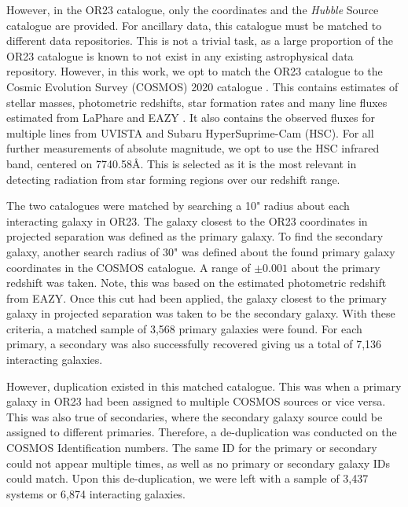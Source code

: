 \documentclass[fleqn,usenatbib]{mnras}
\begin{document}
However, in the OR23 catalogue, only the coordinates and the \textit{Hubble} Source catalogue are provided. For ancillary data, this catalogue must be matched to different data repositories. This is not a trivial task, as a large proportion of the OR23 catalogue is known to not exist in any existing astrophysical data repository. However, in this work, we opt to match the OR23 catalogue to the Cosmic Evolution Survey (COSMOS) 2020 catalogue \citep{2022ApJS..258...11W}. This contains estimates of stellar masses, photometric redshifts, star formation rates and many line fluxes estimated from LaPhare \citep{LaPhare paper} and EAZY \citep{EAZY paper}. It also contains the observed fluxes for multiple lines from UVISTA and Subaru HyperSuprime-Cam (HSC). For all further measurements of absolute magnitude, we opt to use the HSC infrared band, centered on 7740.58\AA. This is selected as it is the most relevant in detecting radiation from star forming regions over our redshift range.

The two catalogues were matched by searching a 10" radius about each interacting galaxy in OR23. The galaxy closest to the OR23 coordinates in projected separation was defined as the primary galaxy. To find the secondary galaxy, another search radius of 30" was defined about the found primary galaxy coordinates in the COSMOS catalogue. A range of $\pm0.001$ about the primary redshift was taken. Note, this was based on the estimated photometric redshift from EAZY. Once this cut had been applied, the galaxy closest to the primary galaxy in projected separation was taken to be the secondary galaxy. With these criteria, a matched sample of 3,568 primary galaxies were found. For each primary, a secondary was also successfully recovered giving us a total of 7,136 interacting galaxies.

However, duplication existed in this matched catalogue. This was when a primary galaxy in OR23 had been assigned to multiple COSMOS sources or vice versa. This was also true of secondaries, where the secondary galaxy source could be assigned to different primaries. Therefore, a de-duplication was conducted on the COSMOS Identification numbers. The same ID for the primary or secondary could not appear multiple times, as well as no primary or secondary galaxy IDs could match. Upon this de-duplication, we were left with a sample of 3,437 systems or 6,874 interacting galaxies.
\end{document}
